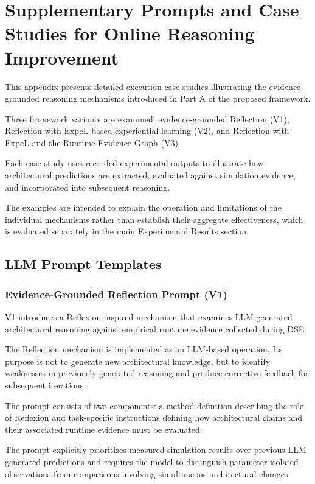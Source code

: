 
\chapter{Supplementary Prompts and Case Studies for Online Reasoning Improvement}
\label{app:p4_supplementary}

This appendix presents detailed execution case studies
illustrating the evidence-grounded reasoning mechanisms
introduced in Part A of the proposed framework.

Three framework variants are examined:
evidence-grounded Reflection (V1),
Reflection with ExpeL-based experiential learning (V2),
and Reflection with ExpeL and the Runtime Evidence
Graph (V3).

Each case study uses recorded experimental outputs
to illustrate how architectural predictions are
extracted, evaluated against simulation evidence,
and incorporated into subsequent reasoning.

The examples are intended to explain the operation
and limitations of the individual mechanisms rather
than establish their aggregate effectiveness,
which is evaluated separately in the main
Experimental Results section.

\section{LLM Prompt Templates}
\label{app:p4_prompts}


\subsection{Evidence-Grounded Reflection Prompt (V1)}
\label{app:p4_reflection_prompt}

V1 introduces a Reflexion-inspired mechanism that
examines LLM-generated architectural reasoning against
empirical runtime evidence collected during DSE.

The Reflection mechanism is implemented as an LLM-based
operation. Its purpose is not to generate new architectural
knowledge, but to identify weaknesses in previously
generated reasoning and produce corrective feedback
for subsequent iterations.

The prompt consists of two components: a method
definition describing the role of Reflexion and
task-specific instructions defining how architectural
claims and their associated runtime evidence must
be evaluated.

The prompt explicitly prioritizes measured simulation
results over previous LLM-generated predictions and
requires the model to distinguish parameter-isolated
observations from comparisons involving simultaneous
architectural changes.

